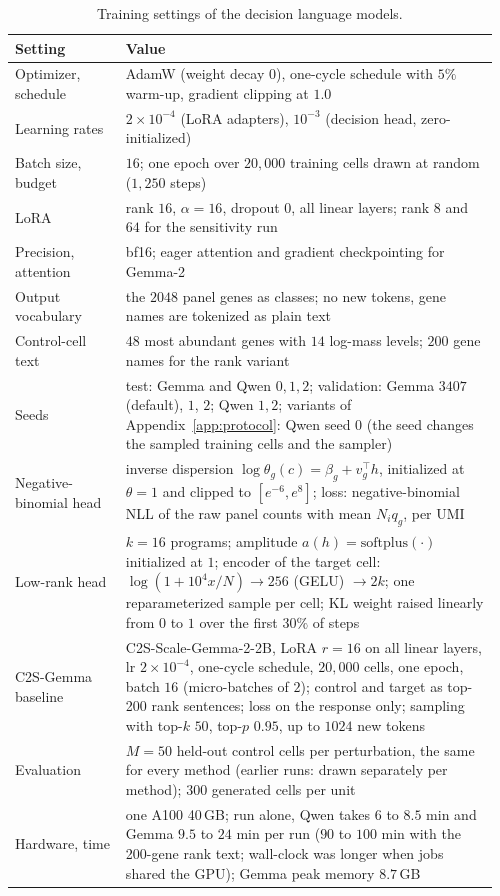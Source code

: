 \documentclass[10pt]{article}
\begin{document}
\begin{table}[!htb]
\centering
\scriptsize
\begin{tabular}{@{}p{0.22\linewidth}p{0.74\linewidth}@{}}
\toprule
Setting & Value \\
\midrule
Optimizer, schedule & AdamW (weight decay $0$), one-cycle schedule with $5\%$ warm-up, gradient clipping at $1.0$ \\
Learning rates & $2\times10^{-4}$ (LoRA adapters), $10^{-3}$ (decision head, zero-initialized) \\
Batch size, budget & $16$; one epoch over $20{,}000$ training cells drawn at random ($1{,}250$ steps) \\
LoRA & rank $16$, $\alpha=16$, dropout $0$, all linear layers; rank $8$ and $64$ for the sensitivity run \\
Precision, attention & bf16; eager attention and gradient checkpointing for Gemma-2 \\
Output vocabulary & the $2048$ panel genes as classes; no new tokens, gene names are tokenized as plain text \\
Control-cell text & $48$ most abundant genes with $14$ log-mass levels; $200$ gene names for the rank variant \\
Seeds & test: Gemma and Qwen $0,1,2$; validation: Gemma $3407$ (default), $1$, $2$; Qwen $1,2$; variants of Appendix~\ref{app:protocol}: Qwen seed $0$ (the seed changes the sampled training cells and the sampler) \\
Negative-binomial head & inverse dispersion $\log\theta_g(c)=\beta_g+v_g^\top h$, initialized at $\theta=1$ and clipped to $[e^{-6},e^{8}]$; loss: negative-binomial NLL of the raw panel counts with mean $N_iq_g$, per UMI \\
Low-rank head & $k=16$ programs; amplitude $a(h)=\mathrm{softplus}(\cdot)$ initialized at $1$; encoder of the target cell: $\log(1+10^4x/N)\to256$ (GELU) $\to2k$; one reparameterized sample per cell; KL weight raised linearly from $0$ to $1$ over the first $30\%$ of steps \\
C2S-Gemma baseline & C2S-Scale-Gemma-2-2B, LoRA $r=16$ on all linear layers, lr $2\times10^{-4}$, one-cycle schedule, $20{,}000$ cells, one epoch, batch $16$ (micro-batches of $2$); control and target as top-200 rank sentences; loss on the response only; sampling with top-$k$ $50$, top-$p$ $0.95$, up to $1024$ new tokens \\
Evaluation & $M=50$ held-out control cells per perturbation, the same for every method (earlier runs: drawn separately per method); $300$ generated cells per unit \\
Hardware, time & one A100 40\,GB; run alone, Qwen takes $6$ to $8.5$ min and Gemma $9.5$ to $24$ min per run ($90$ to $100$ min with the 200-gene rank text; wall-clock was longer when jobs shared the GPU); Gemma peak memory $8.7$\,GB \\
\bottomrule
\end{tabular}
\caption{Training settings of the decision language models.}
\label{tab:train}
\end{table}
\end{document}
